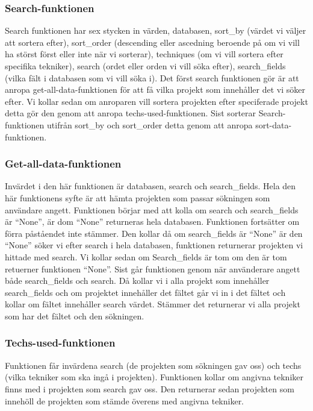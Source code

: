 \documentclass{TDP003mall}
\begin{document}
\subsubsection{Search-funktionen}
Search funktionen har sex stycken in värden, databasen, sort\_by (värdet vi väljer att sortera efter), sort\_order (descending eller ascedning beroende på om vi vill ha störst först eller inte när vi sorterar), techniques (om vi vill sortera efter specifika tekniker), search (ordet eller orden vi vill söka efter), search\_fields (vilka fält i databasen som vi vill söka i). Det först search funktionen gör är att anropa get-all-data-funktionen för att få vilka projekt som innehåller det vi söker efter. Vi kollar sedan om anroparen vill sortera projekten efter speciferade projekt detta gör den genom att anropa techs-used-funktionen. Sist sorterar Search-funktionen utifrån sort\_by och sort\_order detta genom att anropa sort-data-funktionen.

\subsubsection{Get-all-data-funktionen}
Invärdet i den här funktionen är databasen, search och search\_fields. Hela den här funktionens syfte är att hämta projekten som passar sökningen som användare angett. Funktionen börjar med att kolla om search och search\_fields är ``None'', är dom ``None'' returneras hela databasen. Funktionen fortsätter om förra påståendet inte stämmer. Den kollar då om search\_fields är ``None'' är den ``None'' söker vi efter search i hela databasen, funktionen returnerar projekten vi hittade med search. Vi kollar sedan om Search\_fields är tom om den är tom retuerner funktionen ``None''. Sist går funktionen genom när använderare angett både search\_fields och search. Då kollar vi i alla projekt som innehåller search\_fields och om projektet innehåller det fältet går vi in i det fältet och kollar om fältet innehåller search värdet. Stämmer det returnerar vi alla projekt som har det fältet och den sökningen.

\subsubsection{Techs-used-funktionen}
Funktionen får invärdena search (de projekten som sökningen gav oss) och techs (vilka tekniker som ska ingå i projekten). Funktionen kollar om angivna tekniker finns med i projekten som search gav oss. Den returnerar sedan projekten som innehöll de projekten som stämde överens med angivna tekniker.
\end{document}
